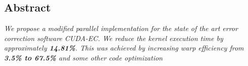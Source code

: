 \documentclass[a0,portrait]{a0poster}
\begin{document}

\begin{multicols}{2} %


\color{DarkRed} 
\section*{Abstract}
\color{Black} 

\emph{We propose a modified parallel implementation for the state of the art error correction software CUDA-EC\cite{shi2010parallel}. We reduce the kernel execution time by approximately \textbf{14.81\%}. This was achieved by increasing warp efficiency from \textbf{3.5\% to 67.5\%} and some other code optimization}






\end{multicols}
\end{document}
